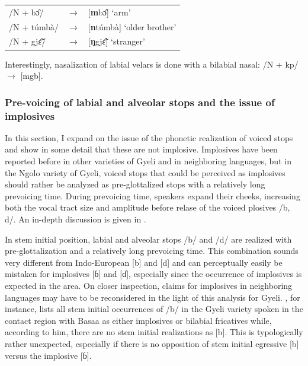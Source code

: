 \fi

\begin{exe} \ex \label{Nassimil}
\begin{tabular}{lll}
/N +  bɔ̂/ & $\rightarrow$ & [{\bfseries m}bɔ̂] `arm' \\
/N + túmbà/ & $\rightarrow$ & [{\bfseries n}túmbà] `older brother'  \\
/N + gjɛ̃̂/ &  $\rightarrow$ & [{\bfseries ŋ}gjɛ̃̂] `stranger' \\
\end{tabular}
\end{exe}


Interestingly, nasalization of labial velars is done with a bilabial nasal: /N + kp/ $\rightarrow$ [mgb]. 






\subsubsection[Pre-voicing of labial and alveolar stops]{Pre-voicing of labial and alveolar stops and the issue of implosives}
\label{sec:Pre-glott}

In this section, I expand on the issue of the phonetic realization of voiced stops and show in some detail that these are not implosive. Implosives have been reported before in other varieties of Gyeli and in neighboring languages, but in the Ngolo variety of Gyeli, voiced stops that could be perceived as implosives should rather be analyzed as pre-glottalized stops with a relatively long prevoicing time.                                                                                                                                                                                                                                                                                                                                                                                                                                                                 During prevoicing time, speakers expand their cheeks, increasing both the vocal tract size and amplitude before relase of the voiced plosives /b, d/.  An in-depth discussion is given in \citet{grimm2019}.

In stem initial position, labial and alveolar stops /b/ and /d/ are realized with pre-glottalization and a relatively long prevoicing time. This combination sounds very different from Indo-European [b] and [d] and can perceptually easily be mistaken for implosives [ɓ] and [ɗ], especially since the occurrence of implosives is expected in the area.  On closer inspection, claims for implosives in neighboring languages may have to be reconsidered in the light of this analysis for Gyeli.
\citet{ngueum2012}, for instance, lists all stem initial occurrences of /b/ in the Gyeli variety spoken in the contact region with Basaa as either implosives or bilabial fricatives while, according to him, there are no stem initial realizations as [b]. This is typologically rather unexpected, especially if there is no opposition of stem initial egressive [b] versus the implosive [ɓ].


